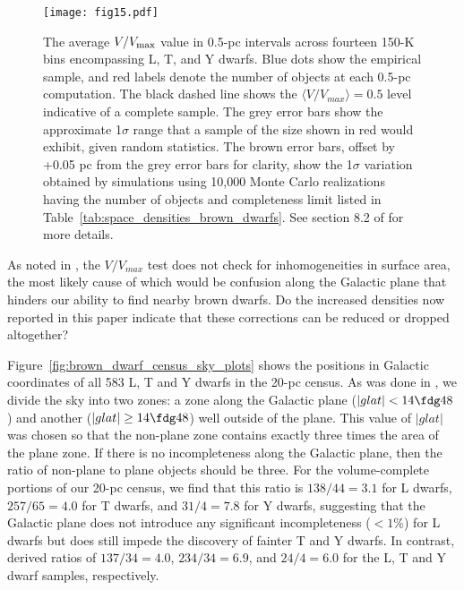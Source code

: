 \documentclass[twocolumn,tighten,twocolappendix]{aastex631}
\begin{document}
\begin{figure*}
\texttt{[image: fig15.pdf]}
\caption{The average $V/V_{\rm max}$ value in 0.5-pc intervals across fourteen 150-K bins encompassing L, T, and Y dwarfs. Blue dots show the empirical sample, and red labels denote the number of objects at each 0.5-pc computation. The black dashed line shows the $\langle{V}/{V_{max}}\rangle = 0.5$ level indicative of a complete sample. The grey error bars show the approximate 1$\sigma$ range that a sample of the size shown in red would exhibit, given random statistics. The brown error bars, offset by +0.05 pc from the grey error bars for clarity, show the 1$\sigma$ variation obtained by simulations using 10,000 Monte Carlo realizations having the number of objects and completeness limit listed in Table~\ref{tab:space_densities_brown_dwarfs}. See section 8.2 of \cite{kirkpatrick2021} for more details. 
\label{fig:v_over_vmax}}
\end{figure*}

As noted in \cite{kirkpatrick2021}, the $V/V_{max}$ test does not check for inhomogeneities in surface area, the most likely cause of which would be confusion along the Galactic plane that hinders our ability to find nearby brown dwarfs. Do the increased densities now reported in this paper indicate that these corrections can be reduced or dropped altogether?

Figure~\ref{fig:brown_dwarf_census_sky_plots} shows the positions in Galactic coordinates of all 583 L, T and Y dwarfs in the 20-pc census. As was done in \cite{kirkpatrick2021}, we divide the sky into two zones: a zone along the Galactic plane ($|glat| < 14{\fdg}48$) and another ($|glat| \ge 14{\fdg}48$) well outside of the plane. This value of $|glat|$ was chosen so that the non-plane zone contains exactly three times the area of the plane zone. If there is no incompleteness along the Galactic plane, then the ratio of non-plane to plane objects should be three. For the volume-complete portions of our 20-pc census, we find that this ratio is $138/44 = 3.1$ for L dwarfs, $257/65 = 4.0$ for T dwarfs, and $31/4 = 7.8$ for Y dwarfs, suggesting that the Galactic plane does not introduce any significant incompleteness ($< 1$\%) for L dwarfs but does still impede the discovery of fainter T and Y dwarfs. In contrast, \cite{kirkpatrick2021} derived ratios of $137/34 = 4.0$, $234/34 = 6.9$, and $24/4 = 6.0$ for the L, T and Y dwarf samples, respectively. 
\end{document}
